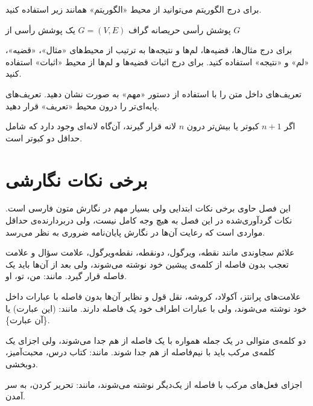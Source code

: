 
برای درج الگوریتم می‌توانید از محیط «الگوریتم» همانند زیر استفاده کنید.

\begin{الگوریتم}{پوشش رأسی حریصانه}
 گراف $G=(V, E)$
 یک پوشش رأسی از $G$
%
\end{الگوریتم}



برای درج مثال‌ها، قضیه‌ها، لم‌ها و نتیجه‌ها به ترتیب از محیط‌های
«مثال»، «قضیه»، «لم» و «نتیجه» استفاده کنید.
برای درج اثبات قضیه‌ها و لم‌ها  از محیط «اثبات» استفاده کنید.

تعریف‌های داخل متن را با استفاده از دستور «مهم» به صورت  نشان دهید.
تعریف‌های پایه‌ای‌تر را درون محیط «تعریف» قرار دهید.

\begin{تعریف}
اگر $n+1$ کبوتر یا بیش‌تر درون  $n$ لانه قرار گیرند، آن‌گاه لانه‌ای
وجود دارد که شامل حداقل دو کبوتر است.
\end{تعریف}




\section{برخی نکات نگارشی}

این فصل حاوی برخی نکات ابتدایی ولی بسیار مهم در نگارش متون فارسی است.
نکات گردآوری‌شده در این فصل به‌ هیچ‌ وجه کامل نیست،
ولی دربردارنده‌ی حداقل مواردی است که رعایت آن‌ها در نگارش پایان‌نامه ضروری به نظر می‌رسد.


\begin{شمارش}

\item
علائم سجاوندی مانند نقطه، ویرگول، دونقطه، نقطه‌ویرگول، علامت سؤال و علامت تعجب %
بدون فاصله از کلمه‌ی پیشین خود نوشته می‌شوند، ولی بعد از آن‌ها باید یک فاصله‌ قرار گیرد. مانند: من، تو، او.
\item
علامت‌های پرانتز، آکولاد، کروشه، نقل قول و نظایر آن‌ها بدون فاصله با عبارات داخل خود نوشته می‌شوند، ولی با عبارات اطراف خود یک فاصله دارند. مانند: (این عبارت) یا \{آن عبارت\}.
\item
دو کلمه‌ی متوالی در یک جمله همواره با یک فاصله از هم جدا می‌شوند، ولی اجزای یک کلمه‌ی مرکب باید با نیم‌فاصله‌‌
 از هم جدا شوند. مانند: کتاب درس، محبت‌آمیز، دوبخشی.
 \item
 اجزای فعل‌های مرکب با فاصله از یک‌دیگر نوشته می‌شوند، مانند: تحریر کردن، به سر آمدن.
\end{شمارش}


